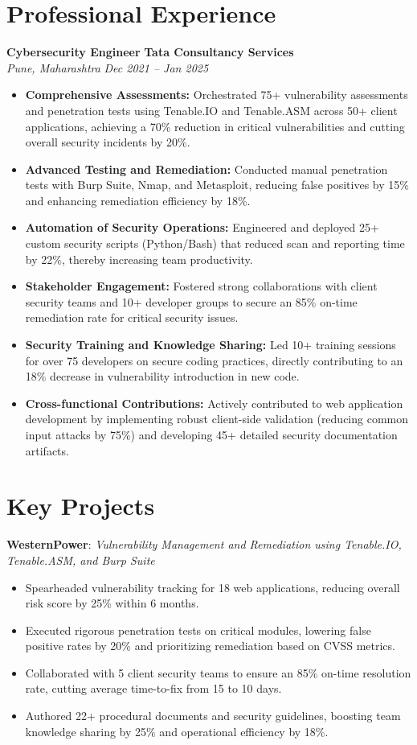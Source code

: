 \documentclass[a4paper,11pt]{article}
\newcommand{\sectiontitle}[1]{\section*{#1}}
\newcommand{\experienceentry}[4]{
\textbf{\textcolor{primary}{#1}} \hfill \textbf{#2} \\
\textit{#3} \hfill \textit{#4} \\
}
\newcommand{\projectentry}[2]{
\raggedright\textbf{\textcolor{primary}{#1}}: \textit{#2} \\
}
\begin{document}
\sectiontitle{Professional Experience}
\experienceentry{Cybersecurity Engineer}{Tata Consultancy Services}{Pune, Maharashtra}{Dec 2021 -- Jan 2025}
\begin{itemize}
\item \textbf{Comprehensive Assessments:} Orchestrated 75+ vulnerability assessments and penetration tests using Tenable.IO and Tenable.ASM across 50+ client applications, achieving a 70\% reduction in critical vulnerabilities and cutting overall security incidents by 20\%.
\item \textbf{Advanced Testing and Remediation:} Conducted manual penetration tests with Burp Suite, Nmap, and Metasploit, reducing false positives by 15\% and enhancing remediation efficiency by 18\%.
\item \textbf{Automation of Security Operations:} Engineered and deployed 25+ custom security scripts (Python/Bash) that reduced scan and reporting time by 22\%, thereby increasing team productivity.
\item \textbf{Stakeholder Engagement:} Fostered strong collaborations with client security teams and 10+ developer groups to secure an 85\% on-time remediation rate for critical security issues.
\item \textbf{Security Training and Knowledge Sharing:} Led 10+ training sessions for over 75 developers on secure coding practices, directly contributing to an 18\% decrease in vulnerability introduction in new code.
\item \textbf{Cross-functional Contributions:} Actively contributed to web application development by implementing robust client-side validation (reducing common input attacks by 75\%) and developing 45+ detailed security documentation artifacts.
\end{itemize}

\sectiontitle{Key Projects}
\projectentry{WesternPower}{Vulnerability Management and Remediation using Tenable.IO, Tenable.ASM, and Burp Suite}
\begin{itemize}
\item Spearheaded vulnerability tracking for 18 web applications, reducing overall risk score by 25\% within 6 months.
\item Executed rigorous penetration tests on critical modules, lowering false positive rates by 20\% and prioritizing remediation based on CVSS metrics.
\item Collaborated with 5 client security teams to ensure an 85\% on-time resolution rate, cutting average time-to-fix from 15 to 10 days.
\item Authored 22+ procedural documents and security guidelines, boosting team knowledge sharing by 25\% and operational efficiency by 18\%.
\end{itemize}
\end{document}
